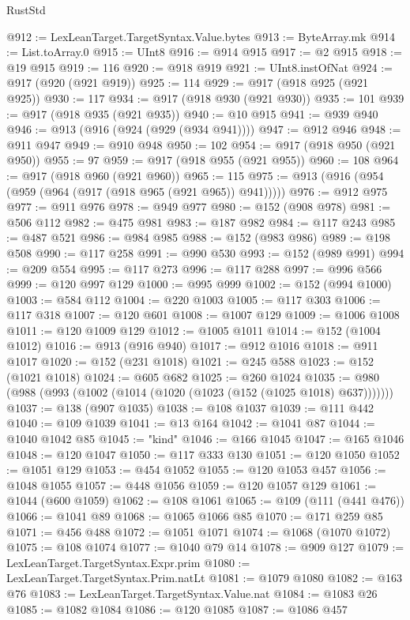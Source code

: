 \begin{lexlean}{RustStd}
\begin{coremodule}
@912 := LexLeanTarget.TargetSyntax.Value.bytes
@913 := ByteArray.mk
@914 := List.toArray.{0}
@915 := UInt8
@916 := @914 @915
@917 := @2 @915
@918 := @19 @915
@919 := 116
@920 := @918 @919
@921 := UInt8.instOfNat
@924 := @917 (@920 (@921 @919))
@925 := 114
@929 := @917 (@918 @925 (@921 @925))
@930 := 117
@934 := @917 (@918 @930 (@921 @930))
@935 := 101
@939 := @917 (@918 @935 (@921 @935))
@940 := @10 @915
@941 := @939 @940
@946 := @913 (@916 (@924 (@929 (@934 @941))))
@947 := @912 @946
@948 := @911 @947
@949 := @910 @948
@950 := 102
@954 := @917 (@918 @950 (@921 @950))
@955 := 97
@959 := @917 (@918 @955 (@921 @955))
@960 := 108
@964 := @917 (@918 @960 (@921 @960))
@965 := 115
@975 := @913 (@916 (@954 (@959 (@964 (@917 (@918 @965 (@921 @965)) @941)))))
@976 := @912 @975
@977 := @911 @976
@978 := @949 @977
@980 := @152 (@908 @978)
@981 := @506 @112
@982 := @475 @981
@983 := @187 @982
@984 := @117 @243
@985 := @487 @521
@986 := @984 @985
@988 := @152 (@983 @986)
@989 := @198 @508
@990 := @117 @258
@991 := @990 @530
@993 := @152 (@989 @991)
@994 := @209 @554
@995 := @117 @273
@996 := @117 @288
@997 := @996 @566
@999 := @120 @997 @129
@1000 := @995 @999
@1002 := @152 (@994 @1000)
@1003 := @584 @112
@1004 := @220 @1003
@1005 := @117 @303
@1006 := @117 @318
@1007 := @120 @601
@1008 := @1007 @129
@1009 := @1006 @1008
@1011 := @120 @1009 @129
@1012 := @1005 @1011
@1014 := @152 (@1004 @1012)
@1016 := @913 (@916 @940)
@1017 := @912 @1016
@1018 := @911 @1017
@1020 := @152 (@231 @1018)
@1021 := @245 @588
@1023 := @152 (@1021 @1018)
@1024 := @605 @682
@1025 := @260 @1024
@1035 := @980 (@988 (@993 (@1002 (@1014 (@1020 (@1023 (@152 (@1025 @1018) @637)))))))
@1037 := @138 (@907 @1035)
@1038 := @108 @1037
@1039 := @111 @442
@1040 := @109 @1039
@1041 := @13 @164
@1042 := @1041 @87
@1044 := @1040 @1042 @85
@1045 := "kind"
@1046 := @166 @1045
@1047 := @165 @1046
@1048 := @120 @1047
@1050 := @117 @333 @130
@1051 := @120 @1050
@1052 := @1051 @129
@1053 := @454 @1052
@1055 := @120 @1053 @457
@1056 := @1048 @1055
@1057 := @448 @1056
@1059 := @120 @1057 @129
@1061 := @1044 (@600 @1059)
@1062 := @108 @1061
@1065 := @109 (@111 (@441 @476))
@1066 := @1041 @89
@1068 := @1065 @1066 @85
@1070 := @171 @259 @85
@1071 := @456 @488
@1072 := @1051 @1071
@1074 := @1068 (@1070 @1072)
@1075 := @108 @1074
@1077 := @1040 @79 @14
@1078 := @909 @127
@1079 := LexLeanTarget.TargetSyntax.Expr.prim
@1080 := LexLeanTarget.TargetSyntax.Prim.natLt
@1081 := @1079 @1080
@1082 := @163 @76
@1083 := LexLeanTarget.TargetSyntax.Value.nat
@1084 := @1083 @26
@1085 := @1082 @1084
@1086 := @120 @1085
@1087 := @1086 @457

\end{coremodule}
\end{lexlean}
